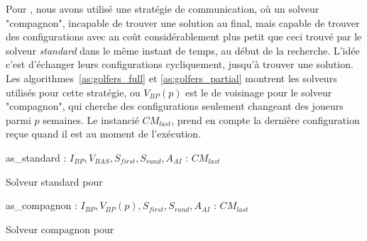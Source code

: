 Pour \SGP{}, nous avons utilisé une stratégie de communication, où un solveur "compagnon", incapable de trouver une solution au final, mais capable de trouver des configurations avec an coût considérablement plus petit que ceci trouvé par le solveur \textit{standard} dans le même instant de temps, au début de la recherche. L'idée c'est d'échanger leurs configurations cycliquement, jusqu'à trouver une solution. Les algorithmes~\ref{as:golfers_full} et \ref{as:golfers_partial} montrent les solveurs utilisés pour cette stratégie, ou $V_{BP}(p)$ est le \om{} de voisinage pour le solveur "compagnon", qui cherche des configurations seulement changeant des joueurs parmi $p$ semaines. Le \opch{} instancié $CM_{last}$, prend en compte la dernière configuration reçue quand il est au moment de l'exécution.

\begin{algorithm}
\dontprintsemicolon
\SetNoline
{}
   as\_standard\;
\algoindent {} : $I_{BP}, V_{BAS}, S_{first}, S_{rand}, A_{AI}$ \;
\algoindent {} : $CM_{last}$ \;
\caption{Solveur standard pour \SGP}\label{as:golfers_full}
\end{algorithm}

\begin{algorithm}
\dontprintsemicolon
\SetNoline
{}
   as\_compagnon\;
\algoindent {} : $I_{BP}, V_{BP}(p), S_{first}, S_{rand}, A_{AI}$ \;
\algoindent {} : $CM_{last}$ \;
\caption{Solveur compagnon pour \SGP}\label{as:golfers_partial}
\end{algorithm}

